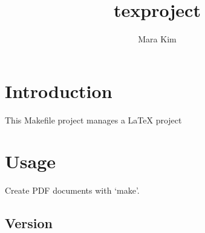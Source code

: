 \documentclass{article}
\author{Mara Kim}
\title{texproject}
\begin{document}
\maketitle
\tableofcontents
\section{Introduction}
This Makefile project manages a \LaTeX{} project
\section{Usage}
Create PDF documents with `make'.

\vspace{\baselineskip}
\subsection*{Version}
\scriptsize{ }
\end{document}

